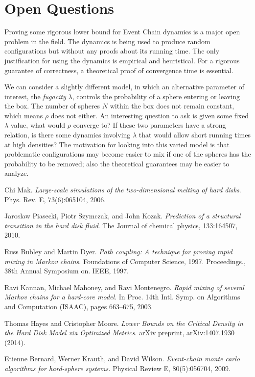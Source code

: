 \documentclass[a4paper,11pt]{article}
\begin{document}
\section*{Open Questions}

Proving some rigorous lower bound for Event Chain dynamics is a major open problem in the field.  The dynamics is being used to produce random configurations but without any proofs about its running time.  The only justification for using the dynamics is empirical and heuristical.  
For a rigorous guarantee of correctness, a theoretical proof of convergence time is essential.

We can consider a slightly different model, in which an alternative parameter of interest, the \textit{fugacity} $\lambda$, controls the probability of a sphere entering or leaving the box. The number of spheres $N$ within the box does not remain constant, which means $\rho$ does not either.  An interesting question to ask is given some fixed $\lambda$ value, what would $\rho$ converge to?  If these two parameters have a strong relation, is there some dynamics involving $\lambda$ that would allow short running times at high densities?  The motivation for looking into this varied model is that problematic configurations may become easier to mix if one of the spheres has the probability to be removed; also the theoretical guarantees may be easier to analyze.

\begin{thebibliography}{9}

  Chi Mak. 
  \emph{Large-scale simulations of the two-dimensional melting of hard disks}.
  Phys. Rev. E,
  73(6):065104, 2006.

  Jaroslaw Piasecki, Piotr Szymczak, and John Kozak.
  \emph{Prediction of a structural transition in the hard disk fluid}.
  The Journal of chemical physics,
  133:164507, 2010.

  Russ Bubley and Martin Dyer.
  \emph{Path coupling: A technique for proving rapid mixing in Markov chains}.
  Foundations of Computer Science, 1997. Proceedings., 38th Annual Symposium on. IEEE,
  1997.

  Ravi Kannan, Michael Mahoney, and Ravi Montenegro.
  \emph{Rapid mixing of several Markov chains for a hard-core model}.
  In Proc. 14th Intl. Symp. on Algorithms and Computation (ISAAC),
  pages 663–675, 2003.

  Thomas Hayes and Cristopher Moore.
  \emph{Lower Bounds on the Critical Density in the Hard Disk Model via Optimized Metrics}.
  arXiv preprint,
  arXiv:1407.1930 (2014).

  Etienne Bernard, Werner Krauth, and David Wilson.
  \emph{Event-chain monte carlo algorithms for hard-sphere systems.}
  Physical Review E,
  80(5):056704, 2009.

\end{thebibliography}
\end{document}

